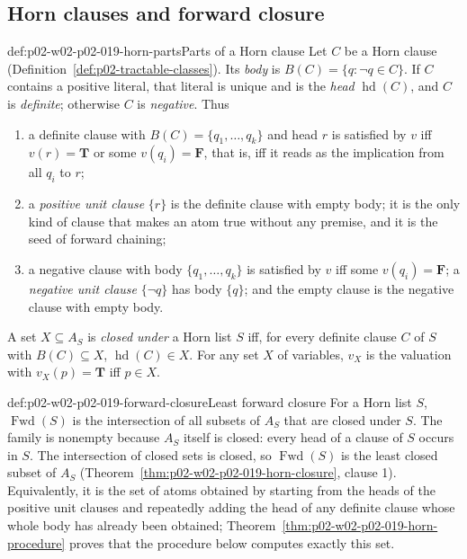 \subsection{Horn clauses and forward closure}
\label{sec:p02-w02-p02-019-horn}

\begin{hbdefinition}{def:p02-w02-p02-019-horn-parts}{Parts of a Horn clause}
Let \(C\) be a Horn clause (Definition~\ref{def:p02-tractable-classes}).  Its
\emph{body} is \(B(C)=\{q: \neg q\in C\}\).  If \(C\) contains a positive
literal, that literal is unique and is the \emph{head} \(\operatorname{hd}(C)\),
and \(C\) is \emph{definite}; otherwise \(C\) is \emph{negative}.  Thus
\begin{enumerate}
  \item a definite clause with \(B(C)=\{q_1,\ldots,q_k\}\) and head \(r\)
        is satisfied by \(v\) iff \(v(r)=\mathbf{T}\) or some \(v(q_i)=\mathbf{F}\),
        that is, iff it reads as the implication from all \(q_i\) to \(r\);
  \item a \emph{positive unit clause} \(\{r\}\) is the definite clause with
        empty body; it is the only kind of clause that makes an atom true
        without any premise, and it is the seed of forward chaining;
  \item a negative clause with body \(\{q_1,\ldots,q_k\}\) is satisfied by
        \(v\) iff some \(v(q_i)=\mathbf{F}\); a \emph{negative unit clause}
        \(\{\neg q\}\) has body \(\{q\}\); and the empty clause is the
        negative clause with empty body.
\end{enumerate}
A set \(X\subseteq A_S\) is \emph{closed under} a Horn list \(S\) iff, for
every definite clause \(C\) of \(S\) with \(B(C)\subseteq X\),
\(\operatorname{hd}(C)\in X\).  For any set \(X\) of variables, \(v_X\) is the
valuation with \(v_X(p)=\mathbf{T}\) iff \(p\in X\).
\end{hbdefinition}

\begin{hbdefinition}{def:p02-w02-p02-019-forward-closure}{Least forward closure}
For a Horn list \(S\), \(\operatorname{Fwd}(S)\) is the intersection of all
subsets of \(A_S\) that are closed under \(S\).  The family is nonempty because
\(A_S\) itself is closed: every head of a clause of \(S\) occurs in \(S\).  The
intersection of closed sets is closed, so \(\operatorname{Fwd}(S)\) is the
least closed subset of \(A_S\)
(Theorem~\ref{thm:p02-w02-p02-019-horn-closure}, clause 1).  Equivalently,
it is the set of atoms obtained by starting from the heads of the positive
unit clauses and repeatedly adding the head of any definite clause whose whole
body has already been obtained; Theorem~\ref{thm:p02-w02-p02-019-horn-procedure}
proves that the procedure below computes exactly this set.
\end{hbdefinition}

